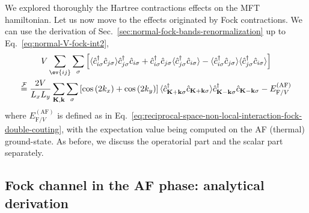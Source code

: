 We explored thoroughly the Hartree contractions effects on the MFT hamiltonian. Let us now move to the effects originated by Fock contractions. We can use the derivation of Sec.~\ref{sec:normal-fock-bands-renormalization} up to Eq.~\eqref{eq:normal-V-fock-int2},
\begin{multline}
	V \sum_{\ev{ij}} \sum_\sigma \left[
		\langle
		\hat c_{i\sigma}^\dagger \hat c_{j\sigma}
		\rangle \hat c_{j\sigma}^\dagger  \hat c_{i\sigma} +
		\hat c_{i\sigma}^\dagger \hat c_{j\sigma}
		\langle \hat c_{j\sigma}^\dagger  \hat c_{i\sigma} \rangle - \langle \hat c_{i\sigma}^\dagger \hat c_{j\sigma}
		\rangle \langle \hat c_{j\sigma}^\dagger  \hat c_{i\sigma} \rangle
	\right] \\
	\stackrel{\mathcal{F}}{=} \frac{2V}{L_x L_y} \sum_{\mathbf{K}, \mathbf{k}} \sum_\sigma \left[
		\cos \left(
			2 k_x
		\right)	+ \cos \left(
			2 k_y
		\right)
	\right]
	\langle
		\hat c_{\mathbf{K}+\mathbf{k} \sigma}^\dagger
		\hat c_{\mathbf{K}+\mathbf{k} \sigma}
	\rangle
	\hat c_{\mathbf{K}-\mathbf{k} \sigma}^\dagger  \hat c_{\mathbf{K}-\mathbf{k}\sigma} - E_{\mathrm{F}/V}^{(\mathrm{AF})} \label{eq:af-V-fock-int1}
\end{multline}
where $E_{\mathrm{F}/V}^{(\mathrm{AF})}$ is defined as in Eq.~\eqref{eq:reciprocal-space-non-local-interaction-fock-double-couting}, with the expectation value being computed on the AF (thermal) ground-state. As before, we discuss the operatorial part and the scalar part separately.

\subsection{Fock channel in the AF phase: analytical derivation}\label{subsec:af-fock-analytical}


